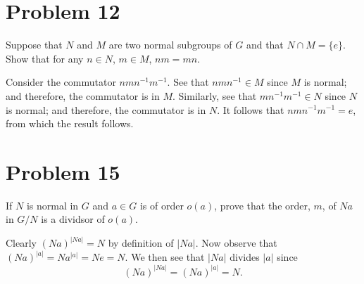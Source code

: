 \documentclass[12pt]{article}
\begin{document}
\section*{Problem 12}

Suppose that $N$ and $M$ are two normal subgroups of $G$ and that
$N\cap M=\{e\}$.  Show that for any $n\in N$, $m\in M$, $nm=mn$.

Consider the commutator $nmn^{-1}m^{-1}$.  See that $nmn^{-1}\in M$
since $M$ is normal; and therefore, the commutator is in $M$.  Similarly,
see that $mn^{-1}m^{-1}\in N$ since $N$ is normal; and therefore, the
commutator is in $N$.  It follows that $nmn^{-1}m^{-1}=e$, from which
the result follows.

\section*{Problem 15}

If $N$ is normal in $G$ and $a\in G$ is of order $o(a)$, prove that the order,
$m$, of $Na$ in $G/N$ is a dividsor of $o(a)$.

Clearly $(Na)^{|Na|}=N$ by definition of $|Na|$.
Now observe that $(Na)^{|a|}=Na^{|a|}=Ne=N$.
We then see that $|Na|$ divides $|a|$ since
\begin{equation*}
(Na)^{|Na|}=(Na)^{|a|}=N.
\end{equation*}
\end{document}
